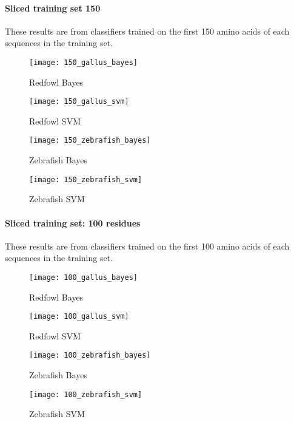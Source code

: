 \documentclass[10pt,letterpaper]{article}
\begin{document}
\newpage

\paragraph*{Sliced training set 150} These results are from classifiers trained on the first 150 amino acids of each sequences in the training set. 
\begin{figure}[H] 
  \label{fig7} 
  \begin{minipage}[b]{0.6\linewidth}
    \texttt{[image: 150\_gallus\_bayes]} 
    \caption{Redfowl Bayes} 
    \vspace{4ex}
  \end{minipage}%
  \begin{minipage}[b]{0.6\linewidth}
    \texttt{[image: 150\_gallus\_svm]} 
    \caption{Redfowl SVM} 
    \vspace{4ex}
  \end{minipage} 
  \begin{minipage}[b]{0.6\linewidth}
    \texttt{[image: 150\_zebrafish\_bayes]} 
    \caption{Zebrafish Bayes} 
    \vspace{4ex}
  \end{minipage}%
  \begin{minipage}[b]{0.6\linewidth}
    \texttt{[image: 150\_zebrafish\_svm]} 
    \caption{Zebrafish SVM} 
    \vspace{4ex}
  \end{minipage} 
\end{figure}

\newpage

\paragraph*{Sliced training set: 100 residues} These results are from classifiers trained on the  first 100 amino acids of each sequences in the training set. 
\begin{figure}[H] 
  \label{fig7} 
  \begin{minipage}[b]{0.6\linewidth}
    \texttt{[image: 100\_gallus\_bayes]} 
    \caption{Redfowl Bayes} 
    \vspace{4ex}
  \end{minipage}%
  \begin{minipage}[b]{0.6\linewidth}
    \texttt{[image: 100\_gallus\_svm]} 
    \caption{Redfowl SVM} 
    \vspace{4ex}
  \end{minipage} 
  \begin{minipage}[b]{0.6\linewidth}
    \texttt{[image: 100\_zebrafish\_bayes]} 
    \caption{Zebrafish Bayes} 
    \vspace{4ex}
  \end{minipage}%
  \begin{minipage}[b]{0.6\linewidth}
    \texttt{[image: 100\_zebrafish\_svm]} 
    \caption{Zebrafish SVM} 
    \vspace{4ex}
  \end{minipage} 
\end{figure}
\end{document}
